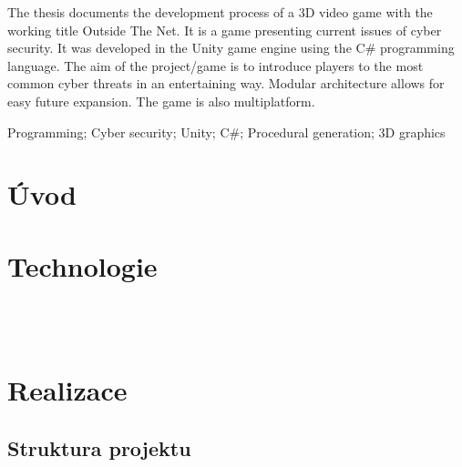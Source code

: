 \documentclass[12pt, a4paper,
 oneside,   
 openright
]{report}
\begin{document}

\noindent The thesis documents the development process of a 3D video game with the working title Outside The Net. It is a game presenting current issues of cyber security. It was developed in the Unity game engine using the C\# programming language. The aim of the project/game is to introduce players to the most common cyber threats in an entertaining way. Modular architecture allows for easy future expansion. The game is also multiplatform.

\vspace{18pt}


\noindent Programming; Cyber security; Unity; C\#; Procedural generation; 3D graphics

\cleardoublepage

\tableofcontents

\pagestyle{fancy}
\setcounter{page}{1}

\chapter{Úvod}



\chapter{Technologie}

\\\\



\chapter{Realizace}
\section{Struktura projektu}
\end{document}
